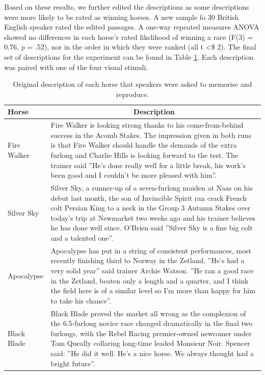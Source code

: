 \documentclass[
  man,floatsintext]{apa6}
\begin{document}
Based on these results, we further edited the descriptions as some descriptions were more likely to be rated as winning horses. A new sample fo 30 British English speaker rated the edited passages. A one-way repeated measures ANOVA showed no differences in each horse's rated likelihood of winning a race (F(3) = 0.76, \emph{p} = .52), nor in the order in which they were ranked (all \textbar t\textbar{} \textless\$ 2). The final set of descriptions for the experiment can be found in Table \ref{tab:tab-horse-description-text}. Each description was paired with one of the four visual stimuli.

\begin{table}[tbp]

\begin{center}
\begin{threeparttable}

\caption{\label{tab:tab-horse-description-text}Original description of each horse that speakers were asked to memorise and reproduce.}

\begin{tabular}{m{2cm}m{13cm}}
\toprule
Horse & \multicolumn{1}{c}{Description}\\
\midrule
Fire Walker & Fire Walker is looking strong thanks to his come-from-behind success in the Acomb Stakes. The impression given in both runs is that Fire Walker should handle the demands of the extra furlong and Charlie Hills is looking forward to the test. The trainer said ''He's done really well for a little break, his work's been good and I couldn't be more pleased with him''.\\
Silver Sky & Silver Sky, a runner-up of a seven-furlong maiden at Naas on his debut last month, the son of Invincible Spirit ran crack French colt Persian King to a neck in the Group 3 Autumn Stakes over today's trip at Newmarket two weeks ago and his trainer believes he has done well since. O'Brien said ''Silver Sky is a fine big colt and a talented one''.\\
Apocalypse & Apocalypse has put in a string of consistent performances, most recently finishing third to Norway in the Zetland. ''He's had a very solid year'' said trainer Archie Watson. ''He ran a good race in the Zetland, beaten only a length and a quarter, and I think the field here is of a similar level so I'm more than happy for him to take his chance''.\\
Black Blade & Black Blade proved the market all wrong as the complexion of the 6.5-furlong novice race changed dramatically in the final two furlongs, with the Rebel Racing premier-owned newcomer under Tom Queally collaring long-time leaded Monsieur Noir. Spencer said: ''He did it well. He's a nice horse. We always thought had a bright future''.\\
\bottomrule
\end{tabular}

\end{threeparttable}
\end{center}

\end{table}
\end{document}
